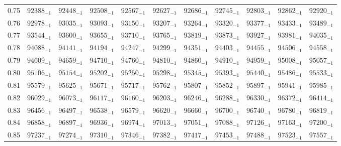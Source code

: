 \documentclass[10pt, a4paper]{article}
\begin{document}
\begin{center}
\begin{longtable}{c | c c c c c | c c c c c}
        0.75 & \({92388}_{-1}\) & \({92448}_{-1}\) & \({92508}_{-1}\) & \({92567}_{-1}\) & \({92627}_{-1}\) & \({92686}_{-1}\) & \({92745}_{-1}\) & \({92803}_{-1}\) & \({92862}_{-1}\) & \({92920}_{-1}\)\\
        0.76 & \({92978}_{-1}\) & \({93035}_{-1}\) & \({93093}_{-1}\) & \({93150}_{-1}\) & \({93207}_{-1}\) & \({93264}_{-1}\) & \({93320}_{-1}\) & \({93377}_{-1}\) & \({93433}_{-1}\) & \({93489}_{-1}\)\\
        0.77 & \({93544}_{-1}\) & \({93600}_{-1}\) & \({93655}_{-1}\) & \({93710}_{-1}\) & \({93765}_{-1}\) & \({93819}_{-1}\) & \({93873}_{-1}\) & \({93927}_{-1}\) & \({93981}_{-1}\) & \({94035}_{-1}\)\\
        0.78 & \({94088}_{-1}\) & \({94141}_{-1}\) & \({94194}_{-1}\) & \({94247}_{-1}\) & \({94299}_{-1}\) & \({94351}_{-1}\) & \({94403}_{-1}\) & \({94455}_{-1}\) & \({94506}_{-1}\) & \({94558}_{-1}\)\\
        0.79 & \({94609}_{-1}\) & \({94659}_{-1}\) & \({94710}_{-1}\) & \({94760}_{-1}\) & \({94810}_{-1}\) & \({94860}_{-1}\) & \({94910}_{-1}\) & \({94959}_{-1}\) & \({95008}_{-1}\) & \({95057}_{-1}\)\\
        0.80 & \({95106}_{-1}\) & \({95154}_{-1}\) & \({95202}_{-1}\) & \({95250}_{-1}\) & \({95298}_{-1}\) & \({95345}_{-1}\) & \({95393}_{-1}\) & \({95440}_{-1}\) & \({95486}_{-1}\) & \({95533}_{-1}\)\\
        0.81 & \({95579}_{-1}\) & \({95625}_{-1}\) & \({95671}_{-1}\) & \({95717}_{-1}\) & \({95762}_{-1}\) & \({95807}_{-1}\) & \({95852}_{-1}\) & \({95897}_{-1}\) & \({95941}_{-1}\) & \({95985}_{-1}\)\\
        0.82 & \({96029}_{-1}\) & \({96073}_{-1}\) & \({96117}_{-1}\) & \({96160}_{-1}\) & \({96203}_{-1}\) & \({96246}_{-1}\) & \({96288}_{-1}\) & \({96330}_{-1}\) & \({96372}_{-1}\) & \({96414}_{-1}\)\\
        0.83 & \({96456}_{-1}\) & \({96497}_{-1}\) & \({96538}_{-1}\) & \({96579}_{-1}\) & \({96620}_{-1}\) & \({96660}_{-1}\) & \({96700}_{-1}\) & \({96740}_{-1}\) & \({96780}_{-1}\) & \({96819}_{-1}\)\\
        0.84 & \({96858}_{-1}\) & \({96897}_{-1}\) & \({96936}_{-1}\) & \({96974}_{-1}\) & \({97013}_{-1}\) & \({97051}_{-1}\) & \({97088}_{-1}\) & \({97126}_{-1}\) & \({97163}_{-1}\) & \({97200}_{-1}\)\\
        0.85 & \({97237}_{-1}\) & \({97274}_{-1}\) & \({97310}_{-1}\) & \({97346}_{-1}\) & \({97382}_{-1}\) & \({97417}_{-1}\) & \({97453}_{-1}\) & \({97488}_{-1}\) & \({97523}_{-1}\) & \({97557}_{-1}\)\\

\end{longtable}
\end{center}
\end{document}
